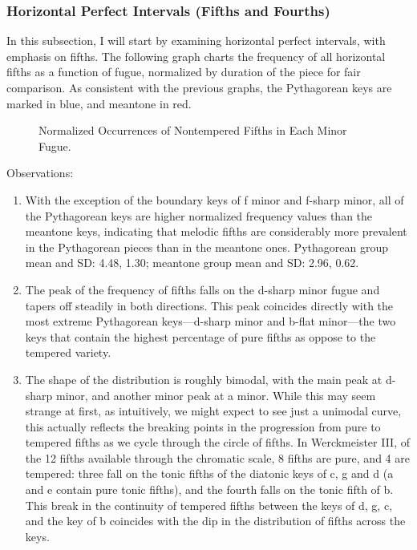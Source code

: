     \subsubsection{Horizontal Perfect Intervals (Fifths and
Fourths)}\label{horizontal-perfect-intervals-fifths-and-fourths}

In this subsection, I will start by examining horizontal perfect
intervals, with emphasis on fifths. The following graph charts the
frequency of all horizontal fifths as a function of fugue, normalized by
duration of the piece for fair comparison. As consistent with the
previous graphs, the Pythagorean keys are marked in blue, and meantone
in red.




\begin{figure}[H]
    \begin{center}
    \caption{Normalized Occurrences of Nontempered Fifths in Each Minor Fugue. }
    \end{center}
\end{figure}
    
    Observations:

\begin{enumerate}
\def\labelenumi{\arabic{enumi}.}
\tightlist
\item
  With the exception of the boundary keys of f minor and f-sharp minor,
  all of the Pythagorean keys are higher normalized frequency values
  than the meantone keys, indicating that melodic fifths are
  considerably more prevalent in the Pythagorean pieces than in the
  meantone ones. Pythagorean group mean and SD: 4.48, 1.30; meantone
  group mean and SD: 2.96, 0.62.
\item
  The peak of the frequency of fifths falls on the d-sharp minor fugue
  and tapers off steadily in both directions. This peak coincides
  directly with the most extreme Pythagorean keys---d-sharp minor
  and b-flat minor---the two keys that contain the highest
  percentage of pure fifths as oppose to the tempered variety.
\item
  The shape of the distribution is roughly bimodal, with the main peak
  at d-sharp minor, and another minor peak at a minor. While this may
  seem strange at first, as intuitively, we might expect to see just a
  unimodal curve, this actually reflects the breaking points in the
  progression from pure to tempered fifths as we cycle through the
  circle of fifths. In Werckmeister III, of the 12 fifths available
  through the chromatic scale, 8 fifths are pure, and 4 are tempered:
  three fall on the tonic fifths of the diatonic keys of c, g and d (a
  and e contain pure tonic fifths), and the fourth falls on the tonic
  fifth of b. This break in the continuity of tempered fifths between
  the keys of d, g, c, and the key of b coincides with the dip in the
  distribution of fifths across the keys.
\end{enumerate}

